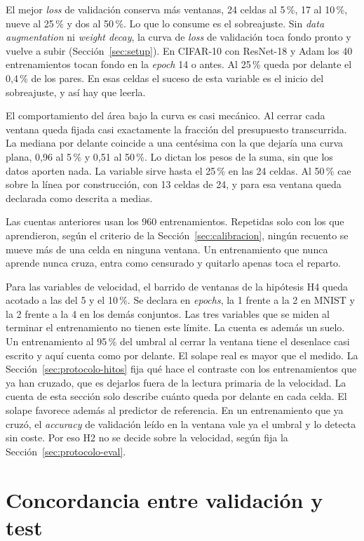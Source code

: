 El mejor \emph{loss} de validación conserva más ventanas, 24 celdas al 5\,\%, 17 al 10\,\%, nueve al 25\,\% y dos al 50\,\%. Lo que lo consume es el sobreajuste. Sin \emph{data augmentation} ni \emph{weight decay}, la curva de \emph{loss} de validación toca fondo pronto y vuelve a subir (Sección~\ref{sec:setup}). En CIFAR-10 con ResNet-18 y Adam los 40 entrenamientos tocan fondo en la \emph{epoch} 14 o antes. Al 25\,\% queda por delante el 0,4\,\% de los pares. En esas celdas el suceso de esta variable es el inicio del sobreajuste, y así hay que leerla.

El comportamiento del área bajo la curva es casi mecánico. Al cerrar cada ventana queda fijada casi exactamente la fracción del presupuesto transcurrida. La mediana por delante coincide a una centésima con la que dejaría una curva plana, 0,96 al 5\,\% y 0,51 al 50\,\%. Lo dictan los pesos de la suma, sin que los datos aporten nada. La variable sirve hasta el 25\,\% en las 24 celdas. Al 50\,\% cae sobre la línea por construcción, con 13 celdas de 24, y para esa ventana queda declarada como descrita a medias.

Las cuentas anteriores usan los 960 entrenamientos. Repetidas solo con los que aprendieron, según el criterio de la Sección~\ref{sec:calibracion}, ningún recuento se mueve más de una celda en ninguna ventana. Un entrenamiento que nunca aprende nunca cruza, entra como censurado y quitarlo apenas toca el reparto.

Para las variables de velocidad, el barrido de ventanas de la hipótesis H4 queda acotado a las del 5 y el 10\,\%. Se declara en \emph{epochs}, la 1 frente a la 2 en MNIST y la 2 frente a la 4 en los demás conjuntos. Las tres variables que se miden al terminar el entrenamiento no tienen este límite. La cuenta es además un suelo. Un entrenamiento al 95\,\% del umbral al cerrar la ventana tiene el desenlace casi escrito y aquí cuenta como por delante. El solape real es mayor que el medido. La Sección~\ref{sec:protocolo-hitos} fija qué hace el contraste con los entrenamientos que ya han cruzado, que es dejarlos fuera de la lectura primaria de la velocidad. La cuenta de esta sección solo describe cuánto queda por delante en cada celda. El solape favorece además al predictor de referencia. En un entrenamiento que ya cruzó, el \emph{accuracy} de validación leído en la ventana vale ya el umbral y lo detecta sin coste. Por eso H2 no se decide sobre la velocidad, según fija la Sección~\ref{sec:protocolo-eval}.

\section{Concordancia entre validación y test}
\label{sec:res-val-test}

